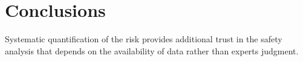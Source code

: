 \section{Conclusions}
\label{sec:conclusions}

	Systematic quantification of the risk provides additional trust in the safety analysis that depends on the availability of data rather than experts judgment. 
